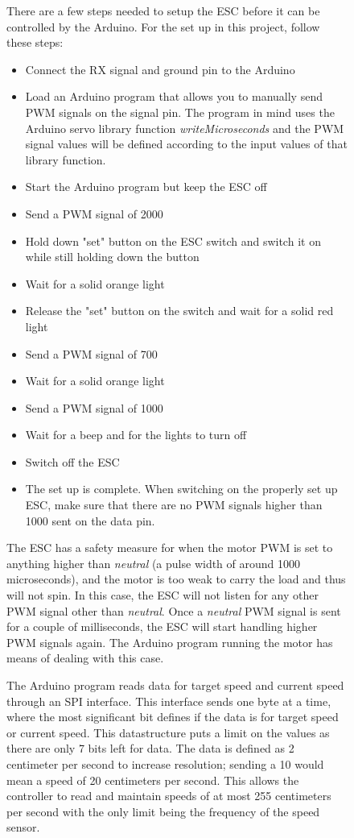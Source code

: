 \documentclass[11pt, titlepage]{article} %
\begin{document}
\begin{figure}
There are a few steps needed to setup the ESC before it can be controlled by the Arduino. For the set up in this project, follow these steps:
\begin{itemize}
	\item Connect the RX signal and ground pin to the Arduino
	\item Load an Arduino program that allows you to manually send PWM signals on the signal pin. The program in mind uses the Arduino servo library function \textit{writeMicroseconds} and the PWM signal values will be defined according to the input values of that library function.
	\item Start the Arduino program but keep the ESC off
	\item Send a PWM signal of 2000
	\item Hold down "set" button on the ESC switch and switch it on while still holding down the button
	\item Wait for a solid orange light
	\item Release the "set" button on the switch and wait for a solid red light
	\item Send a PWM signal of 700
	\item Wait for a solid orange light
	\item Send a PWM signal of 1000
	\item Wait for a beep and for the lights to turn off
	\item Switch off the ESC
	\item The set up is complete. When switching on the properly set up ESC, make sure that there are no PWM signals higher than 1000 sent on the data pin.
\end{itemize}

The ESC has a safety measure for when the motor PWM is set to anything higher than \textit{neutral} (a pulse width of around 1000 microseconds), and the motor is too weak to carry the load and thus will not spin. In this case, the ESC will not listen for any other PWM signal other than \textit{neutral}. Once a \textit{neutral} PWM signal is sent for a couple of milliseconds, the ESC will start handling higher PWM signals again. The Arduino program running the motor has means of dealing with this case.

The Arduino program reads data for target speed and current speed through an SPI interface. This interface sends one byte at a time, where the most significant bit defines if the data is for target speed or current speed. This datastructure puts a limit on the values as there are only 7 bits left for data. The data is defined as 2 centimeter per second to increase resolution; sending a 10 would mean a speed of 20 centimeters per second. This allows the controller to read and maintain speeds of at most 255 centimeters per second with the only limit being the frequency of the speed sensor. 


\end{figure}
\end{document}
